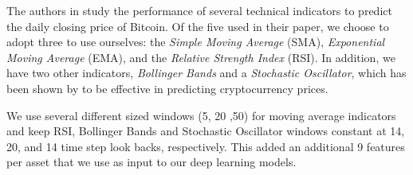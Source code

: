 The authors in \cite{Cocco2021} study the performance of several technical indicators to predict the daily closing price of Bitcoin. Of the five used in their paper, we choose to adopt three to use ourselves: the \textit{Simple Moving Average} (SMA), \textit{Exponential Moving Average} (EMA), and the \textit{Relative Strength Index} (RSI). In addition, we have two other indicators, \textit{Bollinger Bands} and a \textit{Stochastic Oscillator}, which has been shown by \cite{Huang2019} to be effective in predicting cryptocurrency prices. 

We use several different sized windows (5, 20 ,50) for moving average indicators and keep RSI, Bollinger Bands and Stochastic Oscillator windows constant at 14, 20, and 14 time step look backs, respectively. This added an additional 9 features per asset that we use as input to our deep learning models.

